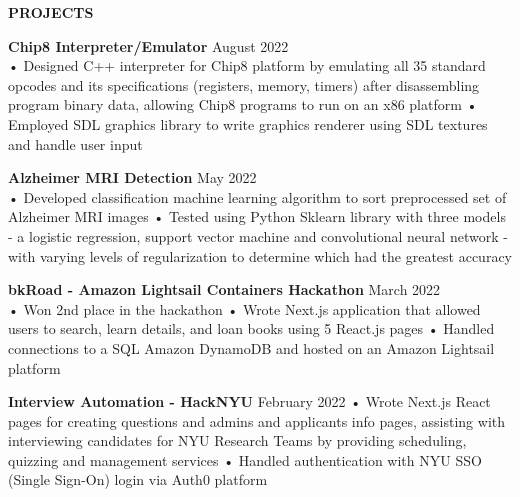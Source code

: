 \documentclass{resume} %
\begin{document}
\begin{rSection}{\textbf{PROJECTS}}

\textbf{Chip8 Interpreter/Emulator } \hfill August 2022 \\
• Designed C++ interpreter for Chip8 platform by emulating all 35 standard opcodes and its specifications (registers, memory, timers) after disassembling program binary data, allowing Chip8 programs to run on an x86 platform \newline
• Employed SDL graphics library to write graphics renderer using SDL textures and handle user input \smallskip

\textbf{Alzheimer MRI Detection } \hfill May 2022 \\
• Developed classification machine learning algorithm to sort preprocessed set of Alzheimer MRI images
\newline
• Tested using Python Sklearn library with three models - a logistic regression, support vector machine and convolutional neural network - with varying levels of regularization to determine which had the greatest accuracy 

\textbf{bkRoad - Amazon Lightsail Containers Hackathon } \hfill March 2022 \\
• Won 2nd place in the hackathon \newline
• Wrote Next.js application that allowed users to search, learn details, and loan books using 5 React.js pages \newline
• Handled connections to a SQL Amazon DynamoDB and hosted on an Amazon Lightsail platform

\textbf{Interview Automation - HackNYU} \hfill February 2022 \newline
• Wrote Next.js React pages for creating questions and admins and  applicants info pages, assisting with interviewing candidates for NYU Research Teams by providing scheduling, quizzing and management services\newline
• Handled authentication with NYU SSO (Single Sign-On) login via Auth0 platform  \smallskip

\end{rSection} 



\end{document}
